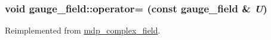 \label{classgauge__field_a765260519dece4a4ffafa338cbee22ae}
\hypertarget{classgauge__field_a1006054965a512e4dd06ca8c0b5c5d28}{
\subsubsection[{operator=}]{\setlength{\rightskip}{0pt plus 5cm}void gauge\_\-field::operator= (const {\bf gauge\_\-field} \& {\em U})}}
\label{classgauge__field_a1006054965a512e4dd06ca8c0b5c5d28}


Reimplemented from \hyperlink{classmdp__complex__field_ad2b736ae31e3ee1f955c10f6ad40928f}{mdp\_\-complex\_\-field}.

